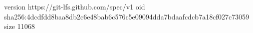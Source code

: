 version https://git-lfs.github.com/spec/v1
oid sha256:4dcdfdd8baa8db2c6e48bab6c576c5e09094dda7bdaafcdcb7a18cf027c73059
size 11068
